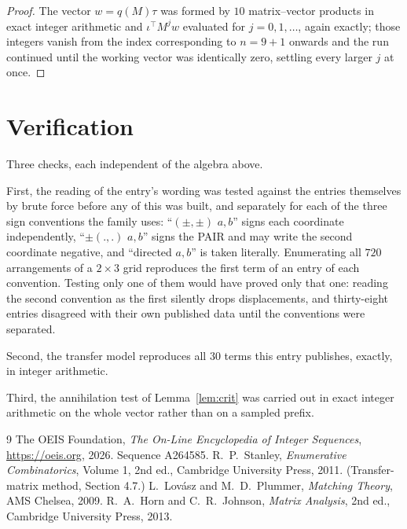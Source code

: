 \documentclass[11pt,a4paper]{article}
\theoremstyle{plain}
\theoremstyle{definition}
\begin{document}
\begin{proof}
The vector $w=q(M)\tau$ was formed by $10$ matrix--vector products in exact integer
arithmetic and $\iota^{\!\top}M^{j}w$ evaluated for $j=0,1,\dots$, again exactly; those
integers vanish from the index corresponding to $n=9+1$ onwards and the run continued
until the working vector was identically zero, settling every larger $j$ at once.
\end{proof}

\section{Verification}

Three checks, each independent of the algebra above.

First, the reading of the entry's wording was tested against the entries themselves by brute
force before any of this was built, and separately for each of the three sign conventions the
family uses: ``$(\pm,\pm)$ $a,b$'' signs each coordinate independently, ``$\pm(.,.)$ $a,b$''
signs the PAIR and may write the second coordinate negative, and ``directed $a,b$'' is taken
literally. Enumerating all $720$ arrangements of a $2\times3$ grid reproduces the first term
of an entry of each convention. Testing only one of them would have proved only that one:
reading the second convention as the first silently drops displacements, and thirty-eight
entries disagreed with their own published data until the conventions were separated.

Second, the transfer model reproduces all $30$ terms this entry publishes, exactly, in
integer arithmetic.

Third, the annihilation test of Lemma~\ref{lem:crit} was carried out in exact integer
arithmetic on the whole vector rather than on a sampled prefix.

\begin{thebibliography}{9}
 The OEIS Foundation, \emph{The On-Line Encyclopedia of Integer
Sequences}, \url{https://oeis.org}, 2026. Sequence A264585.
 R.~P.~Stanley, \emph{Enumerative Combinatorics}, Volume 1, 2nd ed.,
Cambridge University Press, 2011. (Transfer-matrix method, Section 4.7.)
 L.~Lov\'asz and M.~D.~Plummer, \emph{Matching Theory}, AMS Chelsea, 2009.
 R.~A.~Horn and C.~R.~Johnson, \emph{Matrix Analysis}, 2nd ed., Cambridge
University Press, 2013.
\end{thebibliography}
\end{document}
